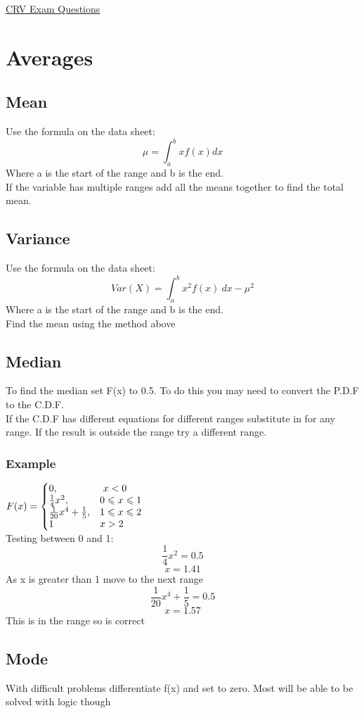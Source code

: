 \documentclass{article}[18pt]
\begin{document}
\begin{center}
\underline{\huge CRV Exam Questions}
\end{center}
\section{Averages}
\subsection{Mean}
Use the formula on the data sheet:
$$\mu=\int_a^bxf(x) dx$$
Where a is the start of the range and b is the end.\\
If the variable has multiple ranges add all the means together to find the total mean.
\subsection{Variance}
Use the formula on the data sheet:
$$Var(X)=\int_a^b x^2f(x) \ dx-\mu^2$$
Where a is the start of the range and b is the end.\\
Find the mean using the method above


\subsection{Median}
To find the median set F(x) to 0.5. To do this you may need to convert the P.D.F to the C.D.F.\\
If the C.D.F has different equations for different ranges substitute in for any range. If the result is outside the range try a different range.
\subsubsection{Example}
{\renewcommand{\arraystretch}{1.5}
$
  F(x)=\left\{
  \begin{array}{@{}ll@{}}
    0, & \ x<0\\
    \frac{1}{4}x^2, &  0\leqslant x \leqslant 1\\
    \frac{1}{20}x^4+\frac{1}{5}, &  1\leqslant x \leqslant 2\\
    1 & x>2
  \end{array}\right.
$}\\
Testing between 0 and 1:
$$\frac{1}{4}x^2=0.5$$
$$x=1.41$$
As x is greater than 1 move to the next range
$$\frac{1}{20}x^4+\frac{1}{5}=0.5$$
$$x=1.57$$
This is in the range so is correct
\subsection{Mode}
With difficult problems differentiate f(x) and set to zero. Most will be able to be solved with logic though
\end{document}
